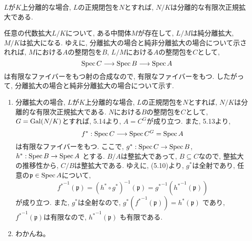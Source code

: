 \documentclass[dvipdfmx]{jsarticle}
\begin{document}
    \begin{lemma}
        $L$が$K$上分離的な場合, $L$の正規閉包を$N$とすれば,
            $N/K$は分離的な有限次正規拡大である.
    \end{lemma}

    \begin{problem}
        任意の代数拡大$L/K$について,
        ある中間体$M$が存在して,
        $L/M$は純分離拡大, $M/K$は拡大になる.
        ゆえに, 分離拡大の場合と純非分離拡大の場合について示されれば,
        $M$における$A$の整閉包を$B$, $L/M$における$A$の整閉包を$C$として,
        \[
            \operatorname{Spec}{C} \longrightarrow \operatorname{Spec}{B} \longrightarrow \operatorname{Spec}{A}
        \]
        は有限なファイバーをもつ射の合成なので, 有限なファイバーをもつ.
        したがって, 分離拡大の場合と純非分離拡大の場合について示す.

        \begin{enumerate}
            \item 分離拡大の場合,
            $L$が$K$上分離的な場合, $L$の正規閉包を$N$とすれば,
            $N/K$は分離的な有限次正規拡大である.
            $N$における$B$の整閉包を$C$として, $G = \operatorname{Gal}(N/K)$とすれば,
            5.14より, $A = C^G$が成り立つ.
            また, 5.13より,
            \[
                f^\ast: \operatorname{Spec}{C} \longrightarrow \operatorname{Spec}{C^G} = \operatorname{Spec}{A}
            \]
            は有限なファイバーをもつ.
            ここで, $g^\ast: \operatorname{Spec}{C} \to \operatorname{Spec}{B}$, $h^\ast: \operatorname{Spec}{B} \to \operatorname{Spec}{A}$
            とする.
            $B/A$は整拡大であって, $B \subseteq C$なので, 整拡大の推移性から,
            $C/B$は整拡大である.
            ゆえに,
            (5.10)より, $g^\ast$は全射であり,
            任意の$\mathfrak{p} \in \operatorname{Spec}{A}$について,
            \[
                {f^{\ast}}^{-1}(\mathfrak{p}) = (h^\ast \circ g^\ast)^{-1}(\mathfrak{p}) = {g^\ast}^{-1}({h^\ast}^{-1}(\mathfrak{p}))
            \]
            が成り立つ.
            また, $g^\ast$は全射なので, $g^\ast({f^\ast}^{-1}(\mathfrak{p})) = h^\ast(\mathfrak{p})$
            であり, ${f^\ast}^{-1}(\mathfrak{p})$は有限なので, ${h^\ast}^{-1}(\mathfrak{p})$
            も有限である.
            \item
            \color{red}
            わかんね。
            \color{black}
        \end{enumerate}
    \end{problem}
\end{document}
